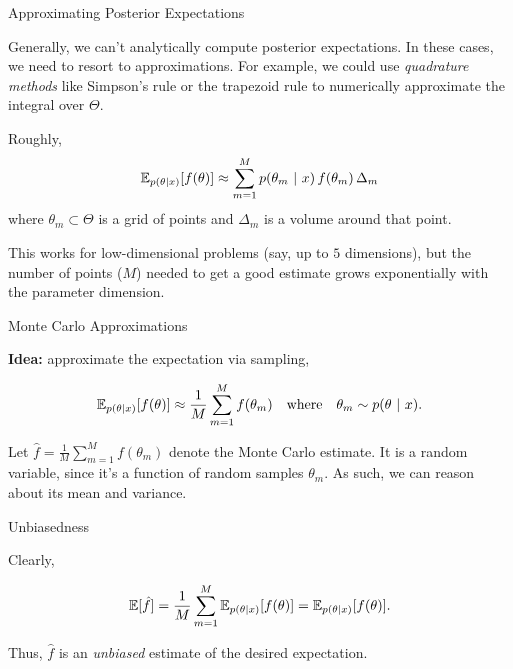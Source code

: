 \documentclass[aspectratio=169]{beamer}
\begin{document}
    
\begin{frame}[t,allowframebreaks]{Approximating Posterior
Expectations}\label{approximating-posterior-expectations}

Generally, we can't analytically compute posterior expectations. In
these cases, we need to resort to approximations. For example, we could
use \emph{quadrature methods} like Simpson's rule or the trapezoid rule
to numerically approximate the integral over \(\Theta\).

Roughly, \begin{align*}
\mathbb{E}_{p(\theta | x)}[f(\theta)] \approx \sum_{m=1}^M p(\theta_m ~\vert~ x) \, f(\theta_m) \, \Delta_m
\end{align*} where \(\theta_m \subset \Theta\) is a grid of points and
\(\Delta_m\) is a volume around that point.

This works for low-dimensional problems (say, up to \(5\) dimensions),
but the number of points (\(M\)) needed to get a good estimate grows
exponentially with the parameter dimension.
\end{frame}

\begin{frame}[t,allowframebreaks]{Monte Carlo
Approximations}\label{monte-carlo-approximations}

\textbf{Idea:} approximate the expectation via sampling,

\begin{align*}
\mathbb{E}_{p(\theta | x)}[f(\theta)] \approx \frac{1}{M} \sum_{m=1}^M f(\theta_m) \quad \text{where} \quad \theta_m \sim p(\theta ~\vert~ x).
\end{align*}

Let \(\hat{f} = \frac{1}{M} \sum_{m=1}^M f(\theta_m)\) denote the Monte
Carlo estimate. It is a random variable, since it's a function of random
samples \(\theta_m\). As such, we can reason about its mean and
variance.
\end{frame}

\begin{frame}[t,allowframebreaks]{Unbiasedness}\label{unbiasedness}

Clearly,

\begin{align*}
\mathbb{E}[\hat{f}] = \frac{1}{M} \sum_{m=1}^M \mathbb{E}_{p(\theta | x)}[f(\theta)] = \mathbb{E}_{p(\theta | x)}[f(\theta)].
\end{align*}

Thus, \(\hat{f}\) is an \emph{unbiased} estimate of the desired
expectation.
\end{frame}
\end{document}
